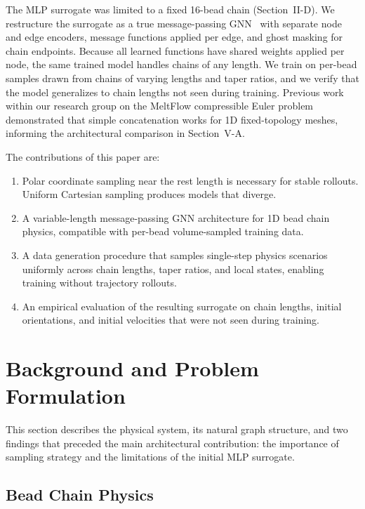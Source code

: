 \documentclass[conference]{IEEEtran}
\begin{document}
The MLP surrogate was limited to a fixed 16-bead chain (Section~II-D). We restructure the surrogate as a true message-passing GNN~\cite{gilmer2017neural} with separate node and edge encoders, message functions applied per edge, and ghost masking for chain endpoints. Because all learned functions have shared weights applied per node, the same trained model handles chains of any length. We train on per-bead samples drawn from chains of varying lengths and taper ratios, and we verify that the model generalizes to chain lengths not seen during training. Previous work within our research group on the MeltFlow compressible Euler problem demonstrated that simple concatenation works for 1D fixed-topology meshes, informing the architectural comparison in Section~V-A.

The contributions of this paper are:
\begin{enumerate}
    \item Polar coordinate sampling near the rest length is necessary for stable rollouts. Uniform Cartesian sampling produces models that diverge.
    \item A variable-length message-passing GNN architecture for 1D bead chain physics, compatible with per-bead volume-sampled training data.
    \item A data generation procedure that samples single-step physics scenarios uniformly across chain lengths, taper ratios, and local states, enabling training without trajectory rollouts.
    \item An empirical evaluation of the resulting surrogate on chain lengths, initial orientations, and initial velocities that were not seen during training.
\end{enumerate}

\section{Background and Problem Formulation}

This section describes the physical system, its natural graph structure, and two findings that preceded the main architectural contribution: the importance of sampling strategy and the limitations of the initial MLP surrogate.

\subsection{Bead Chain Physics}
\end{document}
